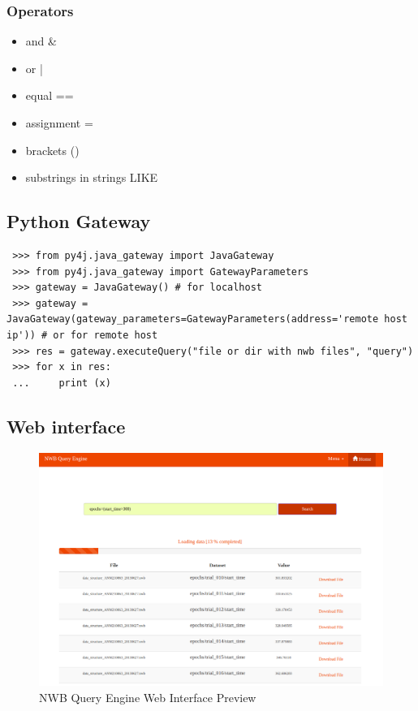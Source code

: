 \documentclass[utf8]{frontiersSCNS} %
\begin{document}
\subsubsection{Operators}


\begin{itemize}
 \item and \&
 \item or  |
 \item equal ==
 \item assignment =
 \item brackets ()
 \item substrings in strings LIKE
\end{itemize}


\subsection{Python Gateway}
\label{Python_Gateway}

\begin{lstlisting}
 >>> from py4j.java_gateway import JavaGateway
 >>> from py4j.java_gateway import GatewayParameters
 >>> gateway = JavaGateway() # for localhost
 >>> gateway = JavaGateway(gateway_parameters=GatewayParameters(address='remote host ip')) # or for remote host
 >>> res = gateway.executeQuery("file or dir with nwb files", "query")
 >>> for x in res:
 ...     print (x)
\end{lstlisting}

\subsection{Web interface}
\label{web_interface}

\begin{figure}
  \includegraphics[width=17cm]{nwb-query-engine-web}
\caption{NWB Query Engine Web Interface Preview}
\label{fig:diagram}
\end{figure}
\end{document}
